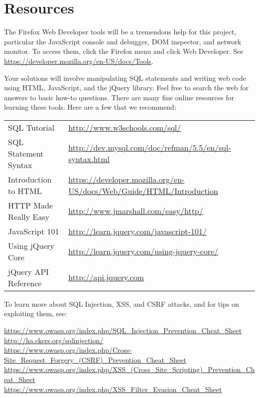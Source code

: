 \documentclass[letterpaper,12pt]{article}
\begin{document}
{\section*{Resources}

The Firefox Web Developer tools will be a tremendous help for this project, particular the JavaScript console and debugger, DOM inspector, and network monitor.  To access them, click the Firefox menu and click Web Developer.  See \url{https://developer.mozilla.org/en-US/docs/Tools}.

\medskip

Your solutions will involve manipulating SQL statements and writing web code using HTML, JavaScript, and the jQuery library.  Feel free to search the web for answers to basic how-to questions.  There are many fine online resources for learning these tools.  Here are a few that we recommend:
\medskip

\begin{tabular}{ll}
SQL Tutorial & \url{http://www.w3schools.com/sql/} \\
SQL Statement Syntax & \url{http://dev.mysql.com/doc/refman/5.5/en/sql-syntax.html} \\
Introduction to HTML & \url{https://developer.mozilla.org/en-US/docs/Web/Guide/HTML/Introduction} \\
HTTP Made Really Easy & \url{http://www.jmarshall.com/easy/http/} \\
JavaScript 101 & \url{http://learn.jquery.com/javascript-101/} \\
Using jQuery Core & \url{http://learn.jquery.com/using-jquery-core/} \\
jQuery API Reference & \url{http://api.jquery.com} \\
\end{tabular}

\bigskip

To learn more about SQL Injection, XSS, and CSRF attacks, and for tips on exploiting them, see:
\medskip

\url{https://www.owasp.org/index.php/SQL_Injection_Prevention_Cheat_Sheet}\\
\url{http://ha.ckers.org/sqlinjection/}\\
\url{https://www.owasp.org/index.php/Cross-Site_Request_Forgery_(CSRF)_Prevention_Cheat_Sheet}\\
\url{https://www.owasp.org/index.php/XSS_(Cross_Site_Scripting)_Prevention_Cheat_Sheet}\\
\url{https://www.owasp.org/index.php/XSS_Filter_Evasion_Cheat_Sheet}\\


}
\end{document}
